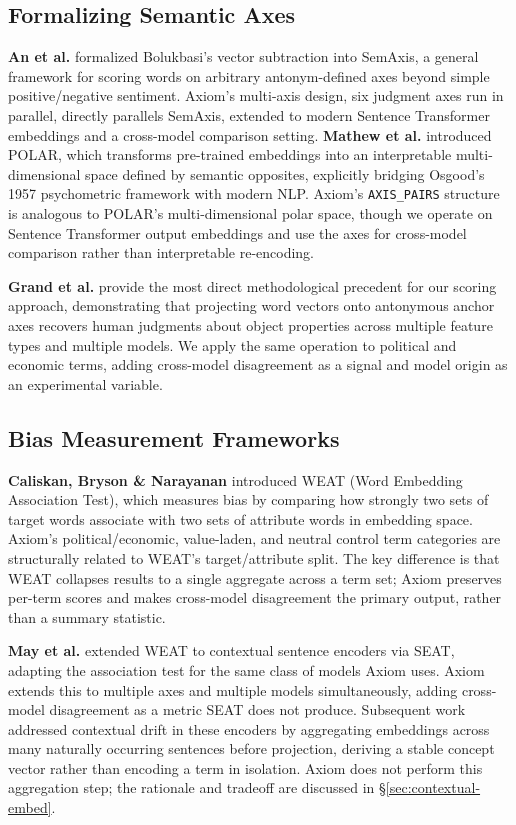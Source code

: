 \documentclass[11pt, letterpaper]{article}
\begin{document}
\subsection{Formalizing Semantic Axes}

\textbf{An et al.} \cite{an2018} formalized Bolukbasi's vector subtraction into SemAxis, a general framework for scoring words on arbitrary antonym-defined axes beyond simple positive/negative sentiment. Axiom's multi-axis design, six judgment axes run in parallel, directly parallels SemAxis, extended to modern Sentence Transformer embeddings and a cross-model comparison setting.
\newpage
\textbf{Mathew et al.} \cite{mathew2020} introduced POLAR, which transforms pre-trained embeddings into an interpretable multi-dimensional space defined by semantic opposites, explicitly bridging Osgood's 1957 psychometric framework with modern NLP. Axiom's \texttt{AXIS\_PAIRS} structure is analogous to POLAR's multi-dimensional polar space, though we operate on Sentence Transformer output embeddings and use the axes for cross-model comparison rather than interpretable re-encoding.

\textbf{Grand et al.} \cite{grand2022} provide the most direct methodological precedent for our scoring approach, demonstrating that projecting word vectors onto antonymous anchor axes recovers human judgments about object properties across multiple feature types and multiple models. We apply the same operation to political and economic terms, adding cross-model disagreement as a signal and model origin as an experimental variable.

\subsection{Bias Measurement Frameworks}

\textbf{Caliskan, Bryson \& Narayanan} \cite{caliskan2017} introduced WEAT (Word Embedding Association Test), which measures bias by comparing how strongly two sets of target words associate with two sets of attribute words in embedding space. Axiom's political/economic, value-laden, and neutral control term categories are structurally related to WEAT's target/attribute split. The key difference is that WEAT collapses results to a single aggregate across a term set; Axiom preserves per-term scores and makes cross-model disagreement the primary output, rather than a summary statistic.

\textbf{May et al.} \cite{may2019} extended WEAT to contextual sentence encoders via SEAT, adapting the association test for the same class of models Axiom uses. Axiom extends this to multiple axes and multiple models simultaneously, adding cross-model disagreement as a metric SEAT does not produce. Subsequent work \cite{bommasani2020,guo2021} addressed contextual drift in these encoders by aggregating embeddings across many naturally occurring sentences before projection, deriving a stable concept vector rather than encoding a term in isolation. Axiom does not perform this aggregation step; the rationale and tradeoff are discussed in \hyperref[sec:contextual-embed]{§\ref*{sec:contextual-embed}}.
\end{document}
